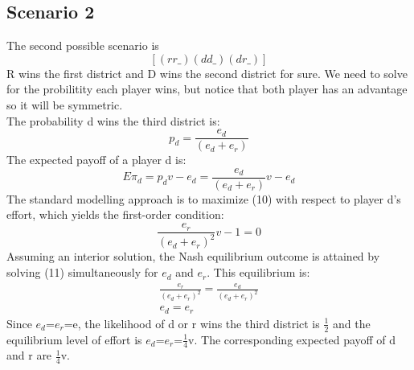 \documentclass[a4paper,12pt]{article}
\begin{document}
\subsection{Scenario 2}
The second possible scenario is $$[(rr\_)(dd\_)(dr\_)]$$
R wins the first district and D wins the second district for sure. We need to solve for the probilitity each player wins, but notice that both player has an advantage so it will be symmetric.
\\The probability d wins the third district is: 
\begin{equation}
p_d = \frac{e_d}{(e_d+e_r)}
\end{equation}
The expected payoff of a player d is:
\begin{equation}
E\pi_d = p_dv-e_d= \frac{e_d}{(e_d+e_r)}v-e_d
\end{equation}
The standard modelling approach is to maximize (10) with respect to player d's effort, which yields the first-order condition: 
\begin{equation}
\frac{e_r}{(e_d+e_r)^2}v-1=0
\end{equation}
Assuming an interior solution, the Nash equilibrium outcome is attained by solving (11) simultaneously for $e_d$ and $e_r$. This equilibrium is: 
\begin{eqnarray} 
\frac{e_r}{(e_d+e_r)^2} = \frac{e_d}{(e_d+e_r)^2} \\
e_d=e_r
\end{eqnarray}
Since $e_d$=$e_r$=e, the likelihood of d or r wins the third district is $\frac{1}{2}$ and the equilibrium level of effort is $e_d$=$e_r$=$\frac{1}{4}$v.
The corresponding expected payoff of d and r are $\frac{1}{4}$v. 
\end{document}
